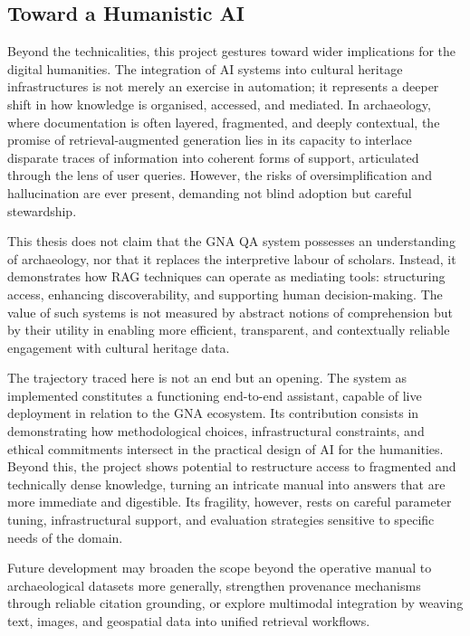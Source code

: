 \begin{spacing}{1.5}
\section{Toward a Humanistic AI}
Beyond the technicalities, this project gestures toward wider implications for the digital humanities. The integration of AI systems into cultural heritage infrastructures is not merely an exercise in automation; it represents a deeper shift in how knowledge is organised, accessed, and mediated. In archaeology, where documentation is often layered, fragmented, and deeply contextual, the promise of retrieval-augmented generation lies in its capacity to interlace disparate traces of information into coherent forms of support, articulated through the lens of user queries. However, the risks of oversimplification and hallucination are ever present, demanding not blind adoption but careful stewardship.

This thesis does not claim that the GNA QA system possesses an understanding of archaeology, nor that it replaces the interpretive labour of scholars. Instead, it demonstrates how RAG techniques can operate as mediating tools: structuring access, enhancing discoverability, and supporting human decision-making. The value of such systems is not measured by abstract notions of comprehension but by their utility in enabling more efficient, transparent, and contextually reliable engagement with cultural heritage data.

The trajectory traced here is not an end but an opening. The system as implemented constitutes a functioning end-to-end assistant, capable of live deployment in relation to the GNA ecosystem. Its contribution consists in demonstrating how methodological choices, infrastructural constraints, and ethical commitments intersect in the practical design of AI for the humanities. Beyond this, the project shows potential to restructure access to fragmented and technically dense knowledge, turning an intricate manual into answers that are more immediate and digestible. Its fragility, however, rests on careful parameter tuning, infrastructural support, and evaluation strategies sensitive to specific needs of the domain.

Future development may broaden the scope beyond the operative manual to archaeological datasets more generally, strengthen provenance mechanisms through reliable citation grounding, or explore multimodal integration by weaving text, images, and geospatial data into unified retrieval workflows.


\end{spacing}
